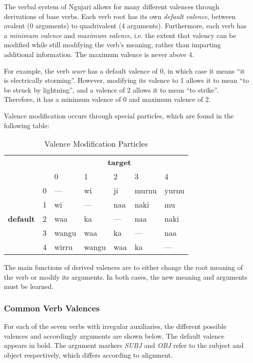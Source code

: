 The verbal system of Ngujari allows for many different valences through
derivations of base verbs. Each verb root has its own \textit{default valence},
between avalent (0 arguments) to quadrivalent (4 arguments). Furthermore, each
verb has a \textit{minimum valence} and \textit{maximum valence}, i.e. the
extent that valency can be modified while still modifying the verb's meaning,
rather than imparting additional information. The maximum valence is never above
4.

For example, the verb \textit{wurr} has a default valence of 0, in which case it
means ``it is electrically storming''. However, modifying its valence to 1
allows it to mean ``to be struck by lightning'', and a valence of 2 allows it to
mean ``to strike''. Therefore, it has a minimum valence of 0 and maximum valence
of 2.

Valence modification occurs through special particles, which are found in the
following table:

\begin{table}[h]
\centering
\begin{tabular}{lllllll}
                                  &   & \multicolumn{5}{c}{\textbf{target}} \\
                                  &   & 0     & 1     & 2   & 3     & 4     \\
\multirow{5}{*}{\textbf{default}} & 0 & ---   & wi    & ji  & murnu & yurnu \\
                                  & 1 & wi    & ---   & naa & naki  & mu    \\
                                  & 2 & waa   & ka    & --- & naa   & naki  \\
                                  & 3 & wangu & waa   & ka  & ---   & naa   \\
                                  & 4 & wirru & wangu & waa & ka    & ---
\end{tabular}
\caption{Valence Modification Particles}
\end{table}

The main functions of derived valences are to either change the root meaning of
the verb or modify its arguments. In both cases, the new meaning and arguments
must be learned.

\subsubsection{Common Verb Valences}

For each of the seven verbs with irregular auxiliaries, the different possible valences and accordingly arguments are shown below. The default valence appears in bold. The argument markers \textit{SUBJ} and \textit{OBJ} refer to the subject and object respectively, which differs according to alignment.


